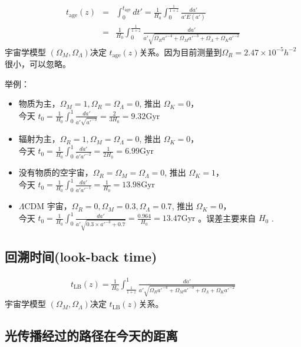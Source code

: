 \documentclass[12pt]{ctexart}
\begin{document}
\begin{eqnarray}
    t_\text{age}(z) &=& \int_0^{t_\text{age}} dt' = \frac{1}{H_0}\int_0^\frac{1}{1+z} \frac{da'}{a' E(a')} \\ 
    &=& \frac{1}{H_0}\int_0^\frac{1}{1+z} \frac{da'}{a' \sqrt{\Omega_R a'^{-4}+\Omega_M a'^{-3}+\Omega_\Lambda+\Omega_K a'^{-2}}}
\end{eqnarray}
宇宙学模型 $\left(\Omega_M, \Omega_\Lambda\right) $决定 $t_\text{age}(z)$关系。因为目前测量到$\Omega_R = 2.47\times10^{-5}h^{-2}$很小，可以忽略。

举例：
\begin{itemize}
    \item 物质为主，$\Omega_M=1, \Omega_R=\Omega_\Lambda=0$, 推出 $\Omega_K=0$，\\今天 $t_0=\frac{1}{H_0}\int_0^1 \frac{da'}{a' \sqrt{a'^{-3}}}=\frac{2}{3 H_0}=9.32 \mathrm{Gyr}$ 
    \item 辐射为主，$\Omega_R=1, \Omega_M=\Omega_\Lambda=0$, 推出 $\Omega_K=0$，\\今天 $t_0=\frac{1}{H_0}\int_0^1 \frac{da'}{a' a'^{-2}}=\frac{1}{2 H_0}=6.99 \mathrm{Gyr}$ 
    \item 没有物质的空宇宙，$\Omega_R=\Omega_M=\Omega_\Lambda=0$, 推出 $\Omega_K=1$，\\今天 $t_0=\frac{1}{H_0}\int_0^1 \frac{da'}{a' a'^{-1}}=\frac{1}{ H_0}=13.98 \mathrm{Gyr}$ 
    \item $\Lambda$CDM 宇宙，$\Omega_R=0, \Omega_M=0.3,\Omega_\Lambda=0.7$, 推出 $\Omega_K=0$，\\今天 $t_0=\frac{1}{H_0}\int_0^1 \frac{da'}{a' \sqrt{0.3\times a'^{-3}+0.7} }=\frac{0.964}{ H_0}=13.47 \mathrm{Gyr}$ 。误差主要来自 $H_0$ .
\end{itemize}

\subsection{回溯时间(look-back time)}
\begin{eqnarray}
    t_\text{LB}(z)  = \frac{1}{H_0}\int_\frac{1}{1+z}^1 \frac{da'}{a' \sqrt{\Omega_R a'^{-4}+\Omega_M a'^{-3}+\Omega_\Lambda+\Omega_K a'^{-2}}}
\end{eqnarray}
宇宙学模型 $\left(\Omega_M, \Omega_\Lambda\right) $决定 $t_\text{LB}(z)$关系。

\subsection{光传播经过的路径在今天的距离}
\end{document}
